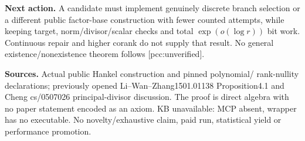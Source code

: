 \documentclass[11pt]{article}
\begin{document}
\textbf{Next action.} A candidate must implement genuinely discrete branch
selection or a different public factor-base construction with fewer counted
attempts, while keeping target, norm/divisor/scalar checks and total
$\exp(o(\log r))$ bit work. Continuous repair and higher corank do not supply
that result. No general existence/nonexistence theorem follows
[pcc:unverified].

\textbf{Sources.} Actual public Hankel construction and pinned polynomial/
rank-nullity declarations; previously opened Li--Wan--Zhang1501.01138
Proposition4.1 and Cheng cs/0507026 principal-divisor discussion. The proof is
direct algebra with no paper statement encoded as an axiom. KB unavailable:
MCP absent, wrapper has no executable. No novelty/exhaustive claim, paid run,
statistical yield or performance promotion.
\end{document}
